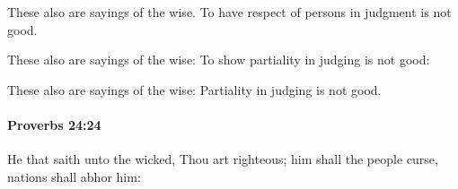 			\begin{versebox}
					\item[BHS] 
					\item[ASV] These also are sayings of the wise. To have respect of persons in judgment is not good.
					\item[NIV] These also are sayings of the wise: To show partiality in judging is not good:
					\item[NRSV] These also are sayings of the wise: Partiality in judging is not good.
			\end{versebox}

		\paragraph{Proverbs 24:24} %
			\label{PROVERBS-24-24}

			He that saith unto the wicked, Thou art righteous; him shall the people curse, nations shall abhor him:

